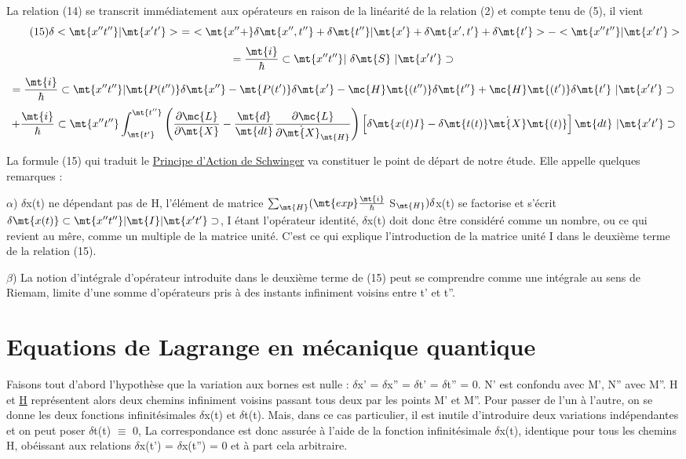 La relation (14) se transcrit immédiatement aux opérateurs en
raison de la linéarité de la relation (2) et compte tenu de (5), il vient
\[
\tag{15}\delta<\mt{ x''t'' }|\mt{ x't' }>\ =\ 
<\mt{x''+}\delta \mt{x'', t''}+\delta \mt{t'' }|\mt{ x'}+\delta \mt{x', t'}+\delta \mt{t'}> - <\mt{ x''t'' }|\mt{ x't' }>
\]
\[
=\frac{\mt{i}}{\hbar}\subset \mt{x''t'' }|\ \delta\mt{S}\ |\mt{ x't'}\supset
\]
\[
=\frac{\mt{i}}{\hbar}\subset \mt{x''t'' }|\mt{ P(t'')}\delta\mt{x''}-\mt{ P(t')}\delta\mt{x'}
-\mc{H}\mt{(t'')}\delta\mt{t''}+\mc{H}\mt{(t')}\delta\mt{t'}\ |\mt{ x't'}\supset
\]
\[
+\frac{\mt{i}}{\hbar}\subset \mt{x''t'' }
\int^\mt{t''}_\mt{t'}
\left(\frac{\partial\mc{L}}{\partial\mt{X}}
-\frac{\mt{d}}{\mt{dt}}\frac{\partial\mc{L}}{\partial\dot{\mt{X}}_\mt{H}}\right)
\left[\delta\mt{x(t) I}-\delta\mt{t(t)}\dot{\mt{X}}\mt{(t)}\right]\mt{dt}\ |\mt{ x't'}\supset
\]

La formule (15) qui traduit le \ul{Principe d'Action de Schwinger}
va constituer le point de départ de notre étude. Elle appelle quelques
remarques :

$\alpha$) $\delta$x(t) ne dépendant pas de H, l'élément de matrice
$\sum_\mt{H}(\mt{exp}\frac{\mt{i}}{\hbar}$ S$_\mt{H})\delta$x(t)
se factorise et s'écrit $\delta\mt{x(t)}\subset \mt{x''t'' }|\mt{ I }|\mt{ x't'}\supset$, I étant l'opérateur identité,
$\delta$x(t) doit donc être considéré comme un nombre, ou ce qui revient au mêre,
comme un multiple de la matrice unité. C'est ce qui explique l'introduction
de la matrice unité I dans le deuxième terme de la relation (15).

$\beta$) La notion d'intégrale d'opérateur introduite dans le deuxième terme de
(15) peut se comprendre comme une intégrale au sens de Riemam, limite d'une
somme d'opérateurs pris à des instants infiniment voisins entre t' et t''.


\section{Equations de Lagrange en mécanique quantique}%
Faisons tout d'abord l'hypothèse que la variation aux bornes est
nulle : $\delta$x' = $\delta$x'' = $\delta$t' = $\delta$t'' = 0. N' est confondu avec M', N'' avec M''.
H et \ul{H} représentent alors deux chemins infiniment voisins passant tous
deux par les points M' et M''. Pour passer de l'un à l'autre, on se donne
les deux fonctions infinitésimales $\delta$x(t) et $\delta$t(t). Mais, dans ce cas particulier, il est inutile d'introduire deux variations indépendantes et on peut
poser $\delta$t(t) $\equiv$ 0, La correspondance est donc assurée à l'aide de la fonction
infinitésimale $\delta$x(t), identique pour tous les chemins H, obéissant aux relations $\delta$x(t') = $\delta$x(t'') = 0 et à part cela arbitraire.

